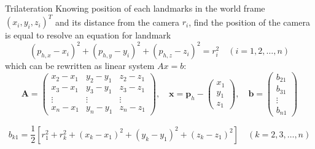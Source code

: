 \documentclass[10pt]{beamer}
\begin{document}
    \begin{frame}[fragile]{Trilateration}
        Knowing position of each landmarks in the world frame $(x_{i}, y_{i}, z_{i})^{T}$ and its distance from the camera $r_{i}$, find the position of the camera is equal to resolve an equation for landmark
        \begin{equation*}
            (p_{h,x} - x_i)^2 + (p_{h,y} - y_i)^2 + (p_{h,z} - z_i)^2 = r_i^2 \quad (i = 1, 2, \dots, n)
        \end{equation*}
        which can be rewritten as linear system $Ax= b$:
        \begin{equation*}
        \bm{A} = \begin{pmatrix}
                x_2 - x_1 & y_2 - y_1 & z_2 - z_1 \\
                x_3 - x_1 & y_3 - y_1 & z_3 - z_1 \\
                \vdots & \vdots & \vdots \\
                x_n - x_1 & y_n - y_1 & z_n - z_1
            \end{pmatrix}, \quad
        \bm{x} =
            \bm{p}_h -
            \begin{pmatrix}
                x_1 \\
                y_1 \\
                z_1
            \end{pmatrix}, \quad
        \bm{b} = \begin{pmatrix}
                b_{21} \\
                b_{31} \\
                \vdots \\
                b_{n1}
            \end{pmatrix}
    \end{equation*}

    \begin{equation*}
        b_{k1} = \frac{1}{2}\left[ r_1^2 + r_k^2 + (x_k - x_1)^2 + (y_k - y_1)^2 + (z_k - z_1)^2 \right] \quad (k = 2, 3, \dots, n)
    \end{equation*}

    \end{frame}
\end{document}
